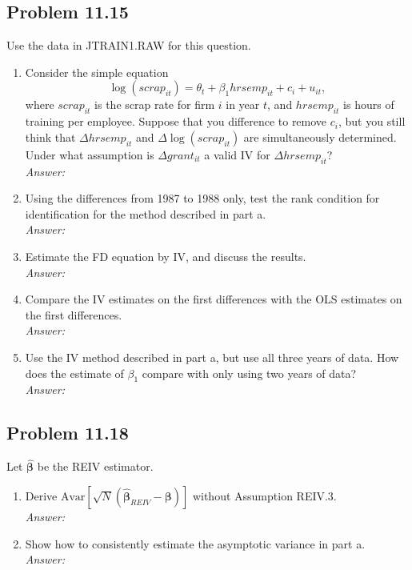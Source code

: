 \documentclass[10pt]{article}
\newcommand{\Av}{\text{Avar}}
\begin{document}
\subsection*{Problem 11.15}
Use the data in JTRAIN1.RAW for this question.
\begin{enumerate}[label=\alph*.]
\item Consider the simple equation \[\log(scrap_{it})=\theta_t+\beta_1hrsemp_{it}+c_i+u_{it},\] where $scrap_{it}$ is the scrap rate for firm $i$ in year $t$, and $hrsemp_{it}$ is hours of training per employee. Suppose that you difference to remove $c_i$, but you still think that $\Delta hrsemp_{it}$ and $\Delta \log(scrap_{it})$ are simultaneously determined. Under what assumption is $\Delta grant_{it}$ a valid IV for $\Delta hrsemp_{it}$?
\\ \textit{Answer:}\\

\item Using the differences from 1987 to 1988 only, test the rank condition for identification for the method described in part a.
\\ \textit{Answer:}\\

\item Estimate the FD equation by IV, and discuss the results.
\\\textit{Answer:}\\

\item Compare the IV estimates on the first differences with the OLS estimates on the first differences.
\\\textit{Answer:}\\

\item Use the IV method described in part a, but use all three years of data. How does the estimate of $\beta_1$ compare with only using two years of data? 
\\\textit{Answer:}\\

\end{enumerate}

\subsection*{Problem 11.18}
Let $\hat{\pmb{\beta}}$ be the REIV estimator.
\begin{enumerate}[label=\alph*.]
\item Derive $\Av[\sqrt{N}(\hat{\pmb{\beta}}_{REIV}-{\pmb{\beta}})]$ without Assumption REIV.3.
\\ \textit{Answer:}\\

\item Show how to consistently estimate the asymptotic variance in part a.
\\ \textit{Answer:}\\

\end{enumerate}
\end{document}
